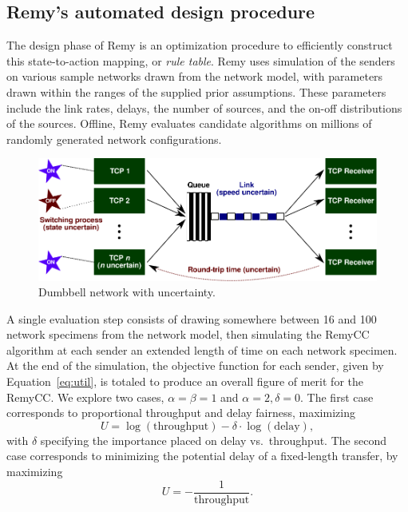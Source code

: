 \subsection{Remy's automated design procedure}

The design phase of Remy is an optimization procedure to efficiently
construct this state-to-action mapping, or \emph{rule table}.  Remy uses simulation of the senders on
various sample networks drawn from the network model, with
parameters drawn within the ranges of the supplied prior
assumptions. These parameters include the link rates, delays, the
number of sources, and the on-off distributions of the
sources. Offline, Remy
evaluates candidate algorithms on
millions of randomly generated network configurations.


\begin{figure}
\vspace{\baselineskip}
\includegraphics[width=\columnwidth]{dumbbell.pdf}
\caption{Dumbbell network with uncertainty.}
\label{fig:dumbbell}

\end{figure}

A single evaluation step consists of drawing somewhere between 16 and
100 network specimens from the network model, then simulating the
RemyCC algorithm at each sender an extended length of time on each
network specimen. At the end of the simulation, the objective function
for each sender, given by Equation~\ref{eq:util}, is totaled to
produce an overall figure of merit for the RemyCC. We explore two
cases, $\alpha = \beta = 1$ and $\alpha=2, \delta = 0$. The first case
corresponds to proportional throughput and delay fairness,
maximizing $$U = \log (\mbox{throughput}) - \delta \cdot \log
(\mbox{delay}),$$ with $\delta$ specifying the importance placed on
delay vs.~throughput. The second case corresponds to minimizing the
potential delay of a fixed-length transfer, by maximizing $$U =
-\frac{1}{\mbox{throughput}}.$$

